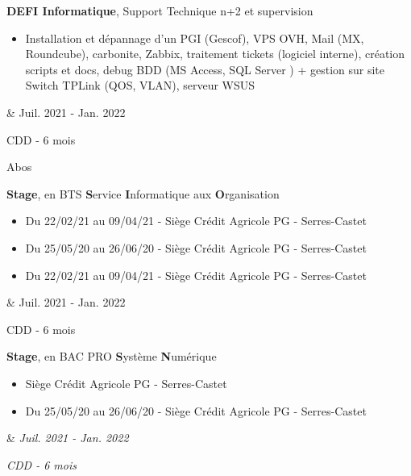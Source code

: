 \documentclass[10pt, letterpaper]{article}
\newenvironment{highlights}{
        \begin{itemize}[
                topsep=0pt,
                parsep=0.10 cm,
                partopsep=0pt,
                itemsep=0pt,
                after=\vspace{-1\baselineskip},
                leftmargin=0.4 cm + 3pt
            ]
    }{
        \end{itemize}
    } %
\let\originalTabularx\tabularx
\let\originalEndTabularx\endtabularx
\renewenvironment{tabularx}{\bgroup\centering\originalTabularx}{\originalEndTabularx\par\egroup}
\begin{document}
\vspace{0.2 cm}
\begin{tabularx}{
	\textwidth-0.4 cm-0.13cm
	}{
	K{0.2 cm}
	R{4.1 cm}
	}
	\textbf{DEFI Informatique}, Support Technique n+2 et supervision
	
	\vspace{0.10 cm}
	
	\begin{highlights}
	\item Installation et dépannage d'un PGI (Gescof), VPS OVH, Mail (MX, Roundcube), carbonite, Zabbix, traitement tickets (logiciel interne), création scripts et docs, debug BDD (MS Access, SQL Server ) + gestion sur site
	Switch TPLink (QOS, VLAN), serveur WSUS           \end{highlights}
	  &   
	Juil. 2021 - Jan. 2022
	
	CDD - 6 mois
	
	Abos
\end{tabularx}
\vspace{0.2 cm}
\begin{tabularx}{
	\textwidth-0.4 cm-0.13cm
	}{
	K{0.2 cm}
	R{4.1 cm}
	}
	\textbf{Stage}, en BTS \textbf{S}ervice \textbf{I}nformatique aux \textbf{O}rganisation
	
	\vspace{0.10 cm}
	
	\begin{highlights}
	\vspace{0.1cm}
	\item Du 22/02/21 au 09/04/21 - Siège Crédit Agricole PG - Serres-Castet
	\item Du 25/05/20 au 26/06/20 - Siège Crédit Agricole PG - Serres-Castet
	\item Du 22/02/21 au 09/04/21 - Siège Crédit Agricole PG - Serres-Castet
	\end{highlights}
	  &   
	Juil. 2021 - Jan. 2022
	
	CDD - 6 mois
\end{tabularx}
\vspace{0.2 cm}
\begin{tabularx}{
	\textwidth-0.4 cm-0.13cm
	}{
	K{0.2 cm}
	R{4.1 cm}
	}
	\textbf{Stage}, en BAC PRO \textbf{S}ystème \textbf{N}umérique 
	
	\vspace{0.10 cm}
	
	\begin{highlights}
	\vspace{0.1cm}
	\item Siège Crédit Agricole PG - Serres-Castet
	\item Du 25/05/20 au 26/06/20 - Siège Crédit Agricole PG - Serres-Castet
	\end{highlights}
	  &   
	\textit{Juil. 2021 - Jan. 2022}
	
	\textit{CDD - 6 mois}
\end{tabularx}
\end{document}
